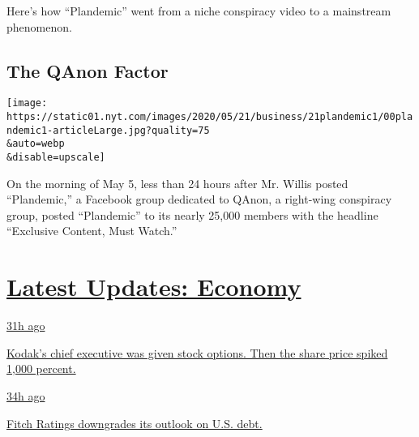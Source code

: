 Here's how ``Plandemic'' went from a niche conspiracy video to a
mainstream phenomenon.

\hypertarget{the-qanon-factor}{%
\subsection{The QAnon Factor}\label{the-qanon-factor}}

\texttt{[image: https://static01.nyt.com/images/2020/05/21/business/21plandemic1/00plandemic1-articleLarge.jpg?quality=75\\\&auto=webp\\\&disable=upscale]}

On the morning of May 5, less than 24 hours after Mr. Willis posted
``Plandemic,'' a Facebook group dedicated to QAnon, a right-wing
conspiracy group, posted ``Plandemic'' to its nearly 25,000 members with
the headline ``Exclusive Content, Must Watch.''

\hypertarget{latest-updates-economy}{%
\section{\texorpdfstring{\href{https://www.nytimes.com/live/2020/07/31/business/stock-market-today-coronavirus?action=click\&pgtype=Article\&state=default\&region=MAIN_CONTENT_1\&context=storylines_live_updates}{Latest
Updates:
Economy}}{Latest Updates: Economy}}\label{latest-updates-economy}}

\href{https://www.nytimes.com/live/2020/07/31/business/stock-market-today-coronavirus?action=click\&pgtype=Article\&state=default\&region=MAIN_CONTENT_1\&context=storylines_live_updates\#kodaks-chief-executive-was-given-stock-options-then-the-share-price-spiked-1000-percent}{31h
ago}

\href{https://www.nytimes.com/live/2020/07/31/business/stock-market-today-coronavirus?action=click\&pgtype=Article\&state=default\&region=MAIN_CONTENT_1\&context=storylines_live_updates\#kodaks-chief-executive-was-given-stock-options-then-the-share-price-spiked-1000-percent}{Kodak's
chief executive was given stock options. Then the share price spiked
1,000 percent.}

\href{https://www.nytimes.com/live/2020/07/31/business/stock-market-today-coronavirus?action=click\&pgtype=Article\&state=default\&region=MAIN_CONTENT_1\&context=storylines_live_updates\#fitch-ratings-downgrades-its-outlook-on-us-debt}{34h
ago}

\href{https://www.nytimes.com/live/2020/07/31/business/stock-market-today-coronavirus?action=click\&pgtype=Article\&state=default\&region=MAIN_CONTENT_1\&context=storylines_live_updates\#fitch-ratings-downgrades-its-outlook-on-us-debt}{Fitch
Ratings downgrades its outlook on U.S. debt.}

